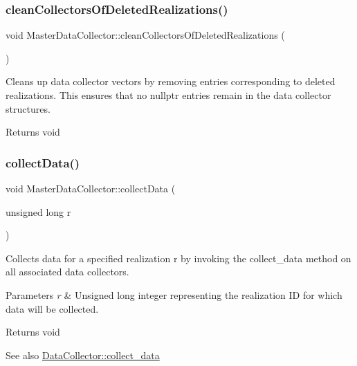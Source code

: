 \subsubsection{\texorpdfstring{clean\+Collectors\+Of\+Deleted\+Realizations()}{cleanCollectorsOfDeletedRealizations()}}
{\footnotesize\ttfamily void Master\+Data\+Collector\+::clean\+Collectors\+Of\+Deleted\+Realizations (\begin{DoxyParamCaption}{ }\end{DoxyParamCaption})}



Cleans up data collector vectors by removing entries corresponding to deleted realizations. This ensures that no {\ttfamily nullptr} entries remain in the data collector structures. 

\begin{DoxyReturn}{Returns}
void 
\end{DoxyReturn}
\mbox{\label{classMasterDataCollector_a522fd42f6cf612e32691cf11a807045c}} 
\subsubsection{\texorpdfstring{collect\+Data()}{collectData()}}
{\footnotesize\ttfamily void Master\+Data\+Collector\+::collect\+Data (\begin{DoxyParamCaption}\item[{unsigned long}]{r }\end{DoxyParamCaption})}



Collects data for a specified realization {\ttfamily r} by invoking the {\ttfamily collect\+\_\+data} method on all associated data collectors. 


\begin{DoxyParams}{Parameters}
{\em r} & Unsigned long integer representing the realization ID for which data will be collected.\\
\hline
\end{DoxyParams}
\begin{DoxyReturn}{Returns}
void
\end{DoxyReturn}
\begin{DoxySeeAlso}{See also}
\mbox{\hyperlink{classDataCollector_a01486bf58acbe37b203f97b3b9a79c40}{Data\+Collector\+::collect\+\_\+data}} 
\end{DoxySeeAlso}
\mbox{\label{classMasterDataCollector_af455c9c6b2de48520c4b1df6c81ebf19}} 
